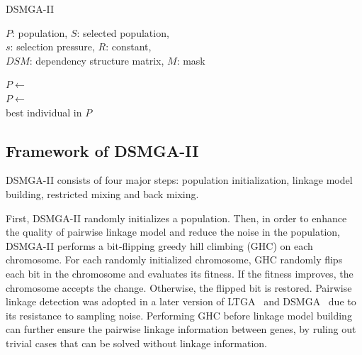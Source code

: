 \documentclass{sig-alternate-05-2015}
\begin{document}
\begin{algorithm}
\caption{DSMGA-II}\label{algo_disjdecomp}


$P$: population, $S$: selected population, \\
$s$: selection pressure, $R$: constant, \\
$DSM$: dependency structure matrix, $M$: mask \\


\BlankLine

$P \leftarrow$  \\
$P \leftarrow$  \\
\Return best individual in $P$
\end{algorithm}


\subsection{Framework of DSMGA-II}
DSMGA-II consists of four major steps: population initialization, linkage model building, restricted mixing and back mixing. 

First, DSMGA-II randomly initializes a population. Then, in order to enhance the quality of pairwise linkage model and reduce the noise in the population, DSMGA-II performs a bit-flipping greedy hill climbing (GHC) on each chromosome. For each randomly initialized chromosome, GHC randomly flips each bit in the chromosome and evaluates its fitness. If the fitness improves, the chromosome accepts the change. Otherwise, the flipped bit is restored. Pairwise linkage detection was adopted in a later version of LTGA~\cite{pelikan:pairwise} and DSMGA~\cite{yu:DSMGA} due to its resistance to sampling noise. Performing GHC before linkage model building can further ensure the pairwise linkage information between genes, by ruling out trivial cases that can be solved without linkage information. 
\end{document}
